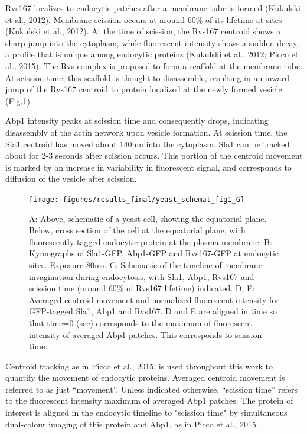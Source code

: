 \vspace{5mm}
Rvs167 localizes to endocytic patches after a membrane tube is formed (Kukulski et al., 2012). Membrane scission occurs at around 60\% of its lifetime at sites (Kukulski et al., 2012). At the time of scission, the Rvs167 centroid shows a sharp jump into the cytoplasm, while fluorescent intensity shows a sudden decay, a profile that is unique among endocytic proteins (Kukulski et al., 2012; Picco et al., 2015). The Rvs complex is proposed to form a scaffold at the membrane tube. At scission time, this scaffold is thought to disassemble, resulting in an inward jump of the Rvs167 centroid to protein localized at the newly formed vesicle (Fig.\ref{fig1_schematic}). 

\vspace{5mm}
Abp1 intensity peaks at scission time and consequently drops, indicating disassembly of the actin network upon vesicle formation. At scission time, the Sla1 centroid has moved about 140nm into the cytoplasm. Sla1 can be tracked about for 2-3 seconds after scission occurs. This portion of the centroid movement is marked by an increase in variability in fluorescent signal, and corresponds to diffusion of the vesicle after scission.




	\begin{figure}[H]
	\centering
	\hspace*{-1.8cm}%
	\texttt{[image: figures/results\_final/yeast\_schemat\_fig1\_G]}
	\caption[Tracking yeast endocytic proteins]
	{A: Above, schematic of a yeast cell, showing the equatorial plane. Below, cross section of the cell at the equatorial plane, with fluorescently-tagged endocytic protein at the plasma membrane. 
B: Kymographs of Sla1-GFP, Abp1-GFP and Rvs167-GFP at endocytic sites. Exposure 80ms.
C: Schematic of the timeline of membrane invagination during endocytosis, with Sla1, Abp1, Rvs167 and scission time (around 60\% of Rvs167 lifetime) indicated. 
D, E: Averaged centroid movement and normalized fluorescent intensity for GFP-tagged Sla1, Abp1 and Rvs167. D and E are aligned in time so that time=0 (sec) corresponds to the maximum of fluorescent intensity of averaged Abp1 patches. This corresponds to scission time.
	\label{fig1_schematic}}
	\end{figure}

\vspace{5mm}
Centroid tracking as in Picco et al., 2015, is used throughout this work to quantify the movement of endocytic proteins. Averaged centroid movement is referred to as just  “movement”. Unless indicated otherwise, “scission time” refers to the fluorescent intensity maximum of averaged Abp1 patches. The protein of interest is aligned in the endocytic timeline to "scission time" by simultaneous dual-colour imaging of this protein and Abp1, as in Picco et al., 2015.

